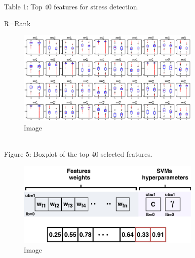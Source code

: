 \documentclass{article}
\begin{document}
Table 1: Top 40 features for stress detection.




R=Rank


\begin{figure}[htbp]
\centering
\includegraphics[width=0.8\textwidth]{images/a41c606205bf7eabfb56a60f2b4aef6e7e8c01c8fbc8cfcdeea8bca520e5cf96.jpg}
\caption{Image}
\end{figure}

\\
Figure 5: Boxplot of the top 40 selected features.


\begin{figure}[htbp]
\centering
\includegraphics[width=0.8\textwidth]{images/7746e4b64e7a5067b8e62ecd8847e1dd076ae501b3346b678df26ce7efb7aa2e.jpg}
\caption{Image}
\end{figure}
\end{document}
